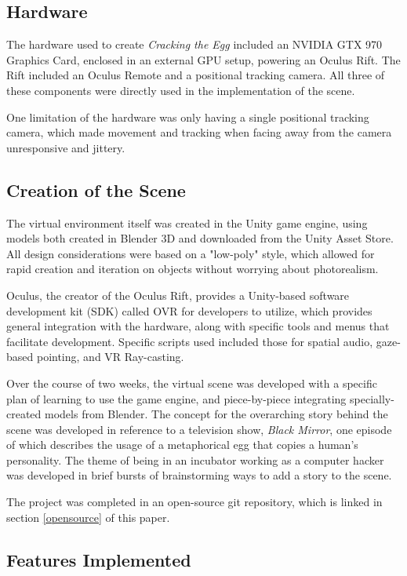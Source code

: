 \documentclass[10pt,twocolumn,letterpaper]{article}
\begin{document}
\subsection{Hardware}

The hardware used to create \textit{Cracking the Egg} included an NVIDIA GTX 970 Graphics Card, enclosed in an external GPU setup, powering an Oculus Rift. The Rift included an Oculus Remote and a positional tracking camera. All three of these components were directly used in the implementation of the scene.

One limitation of the hardware was only having a single positional tracking camera, which made movement and tracking when facing away from the camera unresponsive and jittery.

\subsection{Creation of the Scene}

The virtual environment itself was created in the Unity game engine, using models both created in Blender 3D and downloaded from the Unity Asset Store. All design considerations were based on a "low-poly" style, which allowed for rapid creation and iteration on objects without worrying about photorealism.

Oculus, the creator of the Oculus Rift, provides a Unity-based software development kit (SDK) called OVR for developers to utilize, which provides general integration with the hardware, along with specific tools and menus that facilitate development. Specific scripts used included those for spatial audio, gaze-based pointing, and VR Ray-casting.

Over the course of two weeks, the virtual scene was developed with a specific plan of learning to use the game engine, and piece-by-piece integrating specially-created models from Blender. The concept for the overarching story behind the scene was developed in reference to a television show, \textit{Black Mirror}, one episode of which describes the usage of a metaphorical egg that copies a human's personality. The theme of being in an incubator working as a computer hacker was developed in brief bursts of brainstorming ways to add a story to the scene.

The project was completed in an open-source git repository, which is linked in section \ref{opensource} of this paper.

\subsection{Features Implemented}
\end{document}
